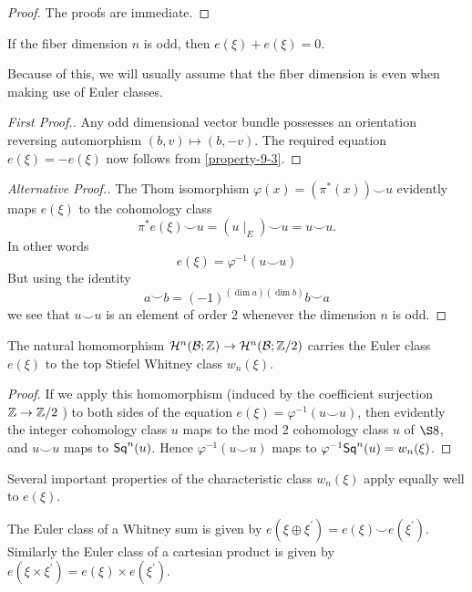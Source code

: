 \begin{proof}
The proofs are immediate.	
\end{proof}
\begin{property}[Naturality]\label{property-9-4}
 If the fiber dimension $ n $ is odd, then $e(\xi)+e(\xi)=0$. 
\end{property}
Because of this, we will usually assume that the fiber dimension is even when making use of Euler classes.
\begin{proof}[First Proof.]
	Any odd dimensional vector bundle possesses an orientation reversing automorphism $(b, v) \mapsto(b,-v)$. The required equation $e(\xi)=-e(\xi)$ now follows from \cref{property-9-3}.
\end{proof}
 
\begin{proof}[Alternative Proof.]
 The Thom isomorphism $\varphi(x)=(\pi^{*}(x)) \smile u$ evidently maps $e(\xi)$ to the cohomology class
 \[
 \pi^{*} e(\xi) \smile u=(u \mid_{ E}) \smile u=u \smile u.
 \]
 In other words
 \[
 e(\xi)=\varphi^{-1}(u \smile u)
 \]
 But using the identity
 \[
 a \smile b=(-1)^{(\dim a)(\dim b)} b \smile a
 \]
 we see that $u \smile u$ is an element of order $2$ whenever the dimension $n$ is odd.
\end{proof}
\begin{property}\label{property-9-5}
	The natural homomorphism $\mathcal{H}^{ n }(\mathcal{B} ; \mathbb{Z}) \rightarrow \mathcal{H}^{ n }(\mathcal{B} ; \mathbb{Z} / 2)$ carries the Euler class $e(\xi)$ to the top Stiefel Whitney class $w_{ n }(\xi)$.
\end{property}
\begin{proof}
	If we apply this homomorphism (induced by the coefficient surjection $\mathbb{Z} \rightarrow \mathbb{Z} / 2$ ) to both sides of the equation $e(\xi)=\varphi^{-1}(u \smile u)$, then evidently the integer cohomology class $u$ maps to the mod 2 cohomology class $u$ of $\S 8$, and $u \smile u$ maps to $\mathsf{Sq}^{n}(u)$. Hence $\varphi^{-1}(u \smile u)$ maps to $\varphi^{-1} \mathsf{Sq}^{ n }(u)=w_{ n }(\xi)$.
\end{proof}

Several important properties of the characteristic class $w_{ n }(\xi)$ apply equally well to $e(\xi)$.
\begin{property}\label{property-9-6}
 The Euler class of a Whitney sum is given by $e(\xi \oplus \xi^{\prime})=e(\xi) \smile e(\xi^{\prime})$. Similarly the Euler class of a cartesian product is given by $e(\xi \times \xi^{\prime})=e(\xi) \times e(\xi^{\prime})$.
\end{property}
 

